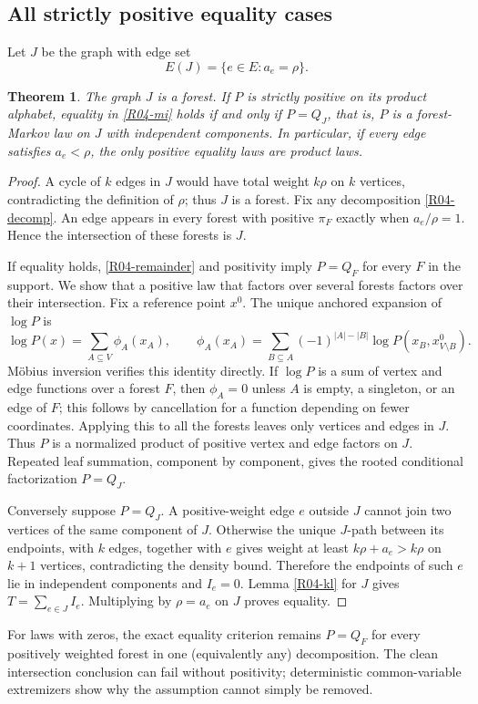 \documentclass[11pt,a4paper]{article}
\newtheorem{theorem}{Theorem}[section]
\theoremstyle{definition}\newtheorem{definition}[theorem]{Definition}
\theoremstyle{remark}\newtheorem{remark}[theorem]{Remark}
\numberwithin{equation}{section}
\begin{document}
\subsection{All strictly positive equality cases}\label{R04-sec-4}\label{R04-equality}
Let $J$ be the graph with edge set
\[
E(J)=\{e\in E:a_e=\rho\}.
\]
\begin{theorem}\label{R04-eqthm}
The graph $J$ is a forest. If $P$ is strictly positive on its product alphabet, equality in \eqref{R04-mi} holds if and only if $P=Q_J$, that is, $P$ is a forest-Markov law on $J$ with independent components.
In particular, if every edge satisfies $a_e<\rho$, the only positive equality laws are product laws.
\end{theorem}
\begin{proof}
A cycle of $k$ edges in $J$ would have total weight $k\rho$ on $k$ vertices, contradicting the definition of $\rho$; thus $J$ is a forest. Fix any decomposition \eqref{R04-decomp}. An edge appears in every forest with positive $\pi_F$ exactly when $a_e/\rho=1$. Hence the intersection of these forests is $J$.

If equality holds, \eqref{R04-remainder} and positivity imply $P=Q_F$ for every $F$ in the support. We show that a positive law that factors over several forests factors over their intersection. Fix a reference point $x^0$. The unique anchored expansion of $\log P$ is
\[
\log P(x)=\sum_{A\subseteq V}\phi_A(x_A),\qquad
\phi_A(x_A)=\sum_{B\subseteq A}(-1)^{|A|-|B|}
\log P(x_B,x^0_{V\setminus B}).
\]
M\"obius inversion verifies this identity directly. If $\log P$ is a sum of vertex and edge functions over a forest $F$, then $\phi_A=0$ unless $A$ is empty, a singleton, or an edge of $F$; this follows by cancellation for a function depending on fewer coordinates. Applying this to all the forests leaves only vertices and edges in $J$. Thus $P$ is a normalized product of positive vertex and edge factors on $J$. Repeated leaf summation, component by component, gives the rooted conditional factorization $P=Q_J$.

Conversely suppose $P=Q_J$. A positive-weight edge $e$ outside $J$ cannot join two vertices of the same component of $J$. Otherwise the unique $J$-path between its endpoints, with $k$ edges, together with $e$ gives weight at least $k\rho+a_e>k\rho$ on $k+1$ vertices, contradicting the density bound. Therefore the endpoints of such $e$ lie in independent components and $I_e=0$. Lemma \ref{R04-kl} for $J$ gives $T=\sum_{e\in J}I_e$. Multiplying by $\rho=a_e$ on $J$ proves equality.
\end{proof}
For laws with zeros, the exact equality criterion remains $P=Q_F$ for every positively weighted forest in one (equivalently any) decomposition. The clean intersection conclusion can fail without positivity; deterministic common-variable extremizers show why the assumption cannot simply be removed.
\end{document}
